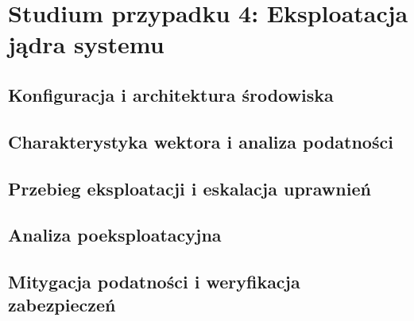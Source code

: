 \chapter{Studium przypadku 4: Eksploatacja jądra systemu}\label{ch:cs4-kernel}

\section{Konfiguracja i architektura środowiska}\label{sec:cs4-srodowisko}

\section{Charakterystyka wektora i analiza podatności}\label{sec:cs4-teoria-podatnosc}

\section{Przebieg eksploatacji i eskalacja uprawnień}\label{sec:cs4-eksploatacja}

\section{Analiza poeksploatacyjna}\label{sec:cs4-analiza-poeksploatacyjna}

\section{Mitygacja podatności i weryfikacja zabezpieczeń}\label{sec:cs4-mitygacja}


